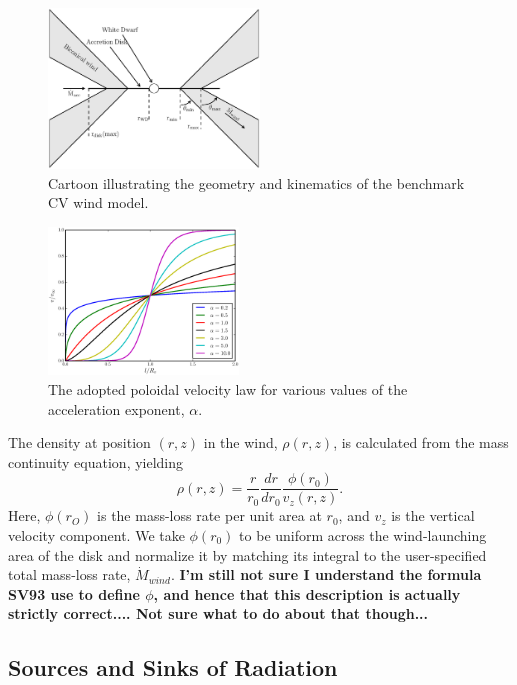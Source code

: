 \documentclass[preprint, a4paper, 11pt]{aastex}
\begin{document}
\begin{figure}
\centering
\includegraphics[width=0.5\textwidth]{figures/fig2_cartoon.eps}
\caption{Cartoon illustrating the geometry and kinematics of the benchmark CV wind model.}
\label{cartoon}
\end{figure}

\begin{figure}
\centering
\includegraphics[width=0.45\textwidth]{figures/acc_law.eps}
\caption{
The adopted poloidal velocity law for various values of the
acceleration exponent, $\alpha$.
}
\label{acc_law}
\end{figure}

The density at position $(r,z)$ in the wind, $\rho(r,z)$, is
calculated from the mass continuity equation, yielding
\begin{equation}
\rho(r,z) = \frac{r}{r_0} \frac{dr}{dr_0} \frac{\phi(r_0)}{v_z(r,z)}.
\label{density}
\end{equation}
Here, $\phi(r_O)$ is the mass-loss rate per unit area at $r_0$, 
and $v_z$ is the vertical velocity component. We take $\phi(r_0)$ to be
uniform across the wind-launching area of the disk and normalize it by
matching its integral to the user-specified total mass-loss rate,
$\dot{M}_{wind}$. 
{\bf I'm still not sure I understand the formula
  SV93 use to define $\phi$, and hence that this description is
  actually strictly correct.... Not sure what to do about that
  though...}

\subsection{Sources and Sinks of Radiation}
\end{document}
